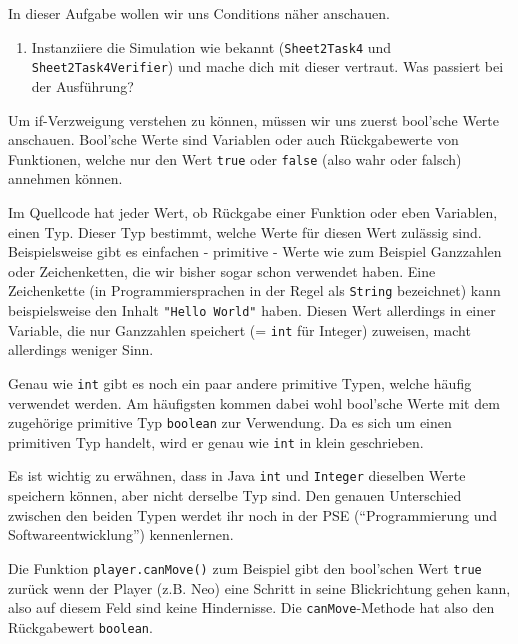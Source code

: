 

In dieser Aufgabe wollen wir uns Conditions näher anschauen.

\begin{enumerate}
    \item Instanziiere die Simulation wie bekannt (\lstinline{Sheet2Task4} und \lstinline{Sheet2Task4Verifier}) und mache dich mit dieser vertraut.
        Was passiert bei der Ausführung?
\end{enumerate}

\begin{Infobox}
    Um if-Verzweigung verstehen zu können, müssen wir uns zuerst bool'sche Werte anschauen. Bool'sche Werte sind Variablen oder auch Rückgabewerte von Funktionen, welche nur den Wert \lstinline{true} oder \lstinline{false} (also wahr oder falsch) annehmen können.\newline

    Im Quellcode hat jeder Wert, ob Rückgabe einer Funktion oder eben Variablen, einen Typ.
    Dieser Typ bestimmt, welche Werte für diesen Wert zulässig sind.
    Beispielsweise gibt es einfachen - primitive - Werte wie zum Beispiel Ganzzahlen oder Zeichenketten, die wir bisher sogar schon verwendet haben.
    Eine Zeichenkette (in Programmiersprachen in der Regel als \texttt{String} bezeichnet) kann beispielsweise den Inhalt \lstinline{"Hello World"} haben.
    Diesen Wert allerdings in einer Variable, die nur Ganzzahlen speichert (= \lstinline{int} für Integer) zuweisen, macht allerdings weniger Sinn.\newline

    Genau wie \lstinline{int} gibt es noch ein paar andere primitive Typen, welche häufig verwendet werden.
    Am häufigsten kommen dabei wohl bool'sche Werte mit dem zugehörige primitive Typ \lstinline{boolean} zur Verwendung.
    Da es sich um einen primitiven Typ handelt, wird er genau wie \lstinline{int} in klein geschrieben.\newline

    Es ist wichtig zu erwähnen, dass in Java \lstinline{int} und \lstinline{Integer} dieselben Werte speichern können, aber nicht derselbe Typ sind.
    Den genauen Unterschied zwischen den beiden Typen werdet ihr noch in der PSE (\enquote{Programmierung und Softwareentwicklung}) kennenlernen.\newline

    Die Funktion \lstinline{player.canMove()} zum Beispiel gibt den bool'schen Wert \lstinline{true} zurück wenn der Player (z.B. Neo) eine Schritt in seine Blickrichtung gehen kann, also auf diesem Feld sind keine Hindernisse.
    Die \lstinline{canMove}-Methode hat also den Rückgabewert \lstinline{boolean}.

\end{Infobox}

